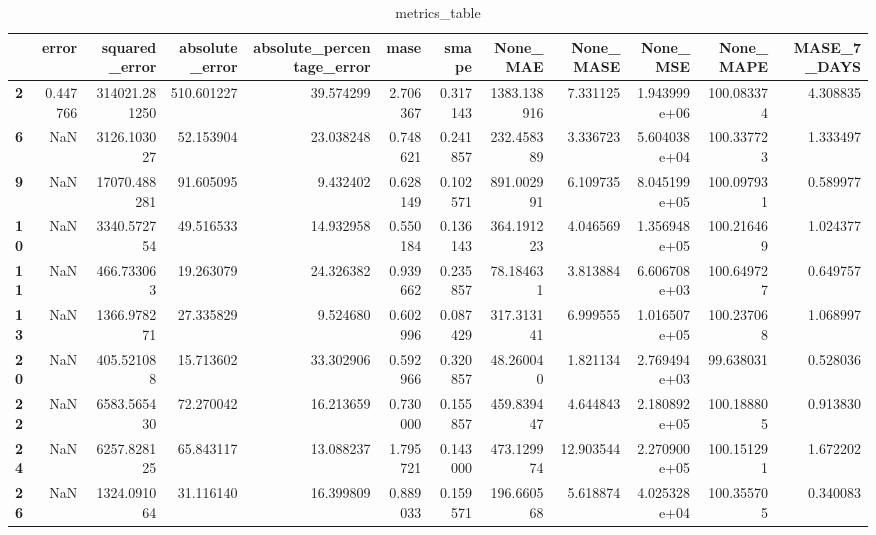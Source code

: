 \begin{table}[h]
\centering
\caption{metrics_table}
\label{table:Final tune for dataset 1 lstm global multivariate. After smape fix}
\begin{tabular}{lrrrrrrrrrrr}
\toprule
{} &     error &  squared\_error &  absolute\_error &  absolute\_percentage\_error &      mase &     smape &     None\_MAE &  None\_MASE &      None\_MSE &   None\_MAPE &  MASE\_7\_DAYS \\
\midrule
\textbf{2 } &  0.447766 &  314021.281250 &      510.601227 &                  39.574299 &  2.706367 &  0.317143 &  1383.138916 &   7.331125 &  1.943999e+06 &  100.083374 &     4.308835 \\
\textbf{6 } &       NaN &    3126.103027 &       52.153904 &                  23.038248 &  0.748621 &  0.241857 &   232.458389 &   3.336723 &  5.604038e+04 &  100.337723 &     1.333497 \\
\textbf{9 } &       NaN &   17070.488281 &       91.605095 &                   9.432402 &  0.628149 &  0.102571 &   891.002991 &   6.109735 &  8.045199e+05 &  100.097931 &     0.589977 \\
\textbf{10} &       NaN &    3340.572754 &       49.516533 &                  14.932958 &  0.550184 &  0.136143 &   364.191223 &   4.046569 &  1.356948e+05 &  100.216469 &     1.024377 \\
\textbf{11} &       NaN &     466.733063 &       19.263079 &                  24.326382 &  0.939662 &  0.235857 &    78.184631 &   3.813884 &  6.606708e+03 &  100.649727 &     0.649757 \\
\textbf{13} &       NaN &    1366.978271 &       27.335829 &                   9.524680 &  0.602996 &  0.087429 &   317.313141 &   6.999555 &  1.016507e+05 &  100.237068 &     1.068997 \\
\textbf{20} &       NaN &     405.521088 &       15.713602 &                  33.302906 &  0.592966 &  0.320857 &    48.260040 &   1.821134 &  2.769494e+03 &   99.638031 &     0.528036 \\
\textbf{22} &       NaN &    6583.565430 &       72.270042 &                  16.213659 &  0.730000 &  0.155857 &   459.839447 &   4.644843 &  2.180892e+05 &  100.188805 &     0.913830 \\
\textbf{24} &       NaN &    6257.828125 &       65.843117 &                  13.088237 &  1.795721 &  0.143000 &   473.129974 &  12.903544 &  2.270900e+05 &  100.151291 &     1.672202 \\
\textbf{26} &       NaN &    1324.091064 &       31.116140 &                  16.399809 &  0.889033 &  0.159571 &   196.660568 &   5.618874 &  4.025328e+04 &  100.355705 &     0.340083 \\

\end{tabular}
\end{table}
